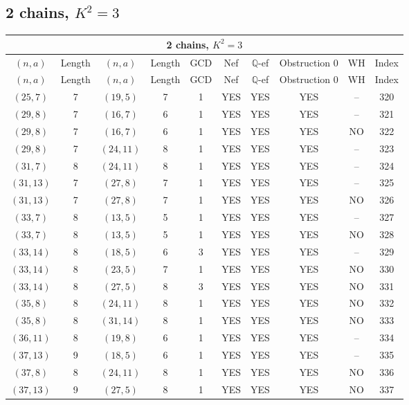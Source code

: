 \subsection{2 chains, $K^2 = 3$}
\begin{longtable}{|c|c|c|c|c|c|c|c|c|c|}
\hline
\multicolumn{10}{|c|}{2 chains, $K^2 = 3$}\\
\hline
$(n,a)$ & Length & $(n,a)$ & Length & GCD & Nef & $\mathbb Q$-ef & Obstruction 0 & WH & Index\\
\hline
\endfirsthead

\hline
$(n,a)$ & Length & $(n,a)$ & Length & GCD & Nef & $\mathbb Q$-ef & Obstruction 0 & WH & Index\\
\hline
\endhead
\hline
\endfoot

$(25, 7)$ & 7 & $(19, 5)$ & 7 & 1 & YES & YES & YES & -- & 320\\
$(29, 8)$ & 7 & $(16, 7)$ & 6 & 1 & YES & YES & YES & -- & 321\\
$(29, 8)$ & 7 & $(16, 7)$ & 6 & 1 & YES & YES & YES & NO & 322\\
$(29, 8)$ & 7 & $(24, 11)$ & 8 & 1 & YES & YES & YES & -- & 323\\
$(31, 7)$ & 8 & $(24, 11)$ & 8 & 1 & YES & YES & YES & -- & 324\\
$(31, 13)$ & 7 & $(27, 8)$ & 7 & 1 & YES & YES & YES & -- & 325\\
$(31, 13)$ & 7 & $(27, 8)$ & 7 & 1 & YES & YES & YES & NO & 326\\
$(33, 7)$ & 8 & $(13, 5)$ & 5 & 1 & YES & YES & YES & -- & 327\\
$(33, 7)$ & 8 & $(13, 5)$ & 5 & 1 & YES & YES & YES & NO & 328\\
$(33, 14)$ & 8 & $(18, 5)$ & 6 & 3 & YES & YES & YES & -- & 329\\
$(33, 14)$ & 8 & $(23, 5)$ & 7 & 1 & YES & YES & YES & NO & 330\\
$(33, 14)$ & 8 & $(27, 5)$ & 8 & 3 & YES & YES & YES & NO & 331\\
$(35, 8)$ & 8 & $(24, 11)$ & 8 & 1 & YES & YES & YES & NO & 332\\
$(35, 8)$ & 8 & $(31, 14)$ & 8 & 1 & YES & YES & YES & NO & 333\\
$(36, 11)$ & 8 & $(19, 8)$ & 6 & 1 & YES & YES & YES & -- & 334\\
$(37, 13)$ & 9 & $(18, 5)$ & 6 & 1 & YES & YES & YES & -- & 335\\
$(37, 8)$ & 8 & $(24, 11)$ & 8 & 1 & YES & YES & YES & NO & 336\\
$(37, 13)$ & 9 & $(27, 5)$ & 8 & 1 & YES & YES & YES & NO & 337\\

\end{longtable}

